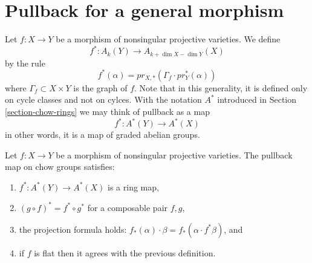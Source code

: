 \section{Pullback for a general morphism}
\label{section-general-pullback}

\noindent
Let $f : X \to Y$ be a morphism of nonsingular projective varieties.
We define
$$
f^* : A_k(Y) \to A_{k+\dim X - \dim Y}(X)
$$
by the rule
$$
f^*(\alpha) = pr_{X, *}(\Gamma_f \cdot pr_Y^*(\alpha))
$$
where $\Gamma_f \subset X\times Y$ is the graph of $f$. Note that in this
generality, it is defined only on cycle classes and not on cylces. With the
notation $A^*$ introduced in Section \ref{section-chow-rings}
we may think of pullback as a map
$$
f^* : A^*(Y) \to A^*(X)
$$
in other words, it is a map of graded abelian groups.

\begin{lemma}
\label{lemma-pullback-and-intersection-product}
Let $f : X \to Y$ be a morphism of nonsingular projective varieties.
The pullback map on chow groups satisfies:
\begin{enumerate}
\item $f^* : A^*(Y) \to A^*(X)$ is a ring map,
\item $(g \circ f)^* = f^* \circ g^*$ for a composable pair $f, g$,
\item the projection formula holds: $f_*(\alpha) \cdot \beta =
f_*( \alpha \cdot f^*\beta)$, and
\item if $f$ is flat then it agrees with the previous definition.
\end{enumerate}
\end{lemma}

